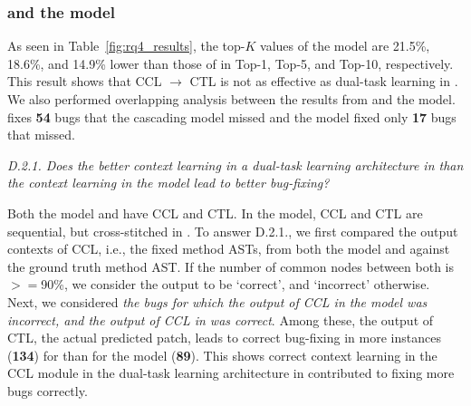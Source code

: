 

\subsubsection{{\bf {\tool} and the  model}}

As seen in Table~\ref{fig:rq4_results}, the top-$K$ values of the
 model are 21.5\%, 18.6\%, and 14.9\% lower than those
of {\tool} in Top-1, Top-5, and Top-10, respectively. This result
shows that CCL $\rightarrow$ CTL is not as effective as dual-task
learning in {\tool}.
%
%
We also performed overlapping analysis between the results from
{\tool} and the  model. {\tool} fixes {\bf 54} bugs
that the cascading model missed and the  model fixed
only {\bf 17} bugs that {\tool} missed.

{\em D.2.1. Does the better context learning in a dual-task learning
  architecture in {\tool} than the context learning in the
   model lead to better bug-fixing?}

Both the  model and {\tool} have CCL and CTL. In the
 model, CCL and CTL are sequential, but cross-stitched
in {\tool}. To answer D.2.1., we first compared the output contexts of
CCL, i.e., the fixed method ASTs, from both the  model
and {\tool} against the ground truth method AST. If the number of
common nodes between both is$>=$90\%, we consider the output to be
`correct', and `incorrect' otherwise. Next, we considered {\em the
  bugs for which the output of CCL in the  model was
  incorrect, and the output of CCL in {\tool} was correct}. Among
these, the output of CTL, the actual predicted patch, leads to correct
bug-fixing in more instances ({\bf 134}) for {\tool} than for the
 model ({\bf 89}). This shows correct context learning
in the CCL module in the dual-task learning architecture in {\tool}
contributed to fixing more bugs correctly.

